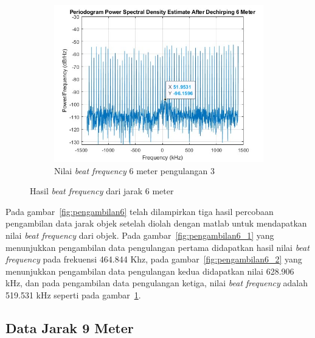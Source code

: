 \begin{figure}
\begin{subfigure}[b]{0.6\textwidth}
        \centering
		\includegraphics[scale=0.35]{pics/bab5/Range/3_6.jpg}
		\caption{Nilai \textit{beat frequency} 6 meter pengulangan 3}
		\label{fig:pengambilan6_3}
    \end{subfigure}
    \caption{Hasil \textit{beat frequency} dari jarak 6 meter}
    \label{fig:pengambilan3}
\end{figure}

Pada gambar~\ref{fig:pengambilan6} telah dilampirkan tiga hasil percobaan pengambilan data jarak objek setelah diolah dengan matlab untuk mendapatkan nilai \textit{beat frequency} dari objek. Pada gambar~\ref{fig:pengambilan6_1} yang menunjukkan pengambilan data pengulangan pertama didapatkan hasil nilai \textit{beat frequency} pada frekuensi 464.844 Khz, pada gambar~\ref{fig:pengambilan6_2} yang menunjukkan pengambilan data pengulangan kedua didapatkan nilai 628.906 kHz, dan pada pengambilan data pengulangan ketiga, nilai \textit{beat frequency} adalah 519.531 kHz seperti pada gambar~\ref{fig:pengambilan6_3}.

\subsection{Data Jarak 9 Meter}

